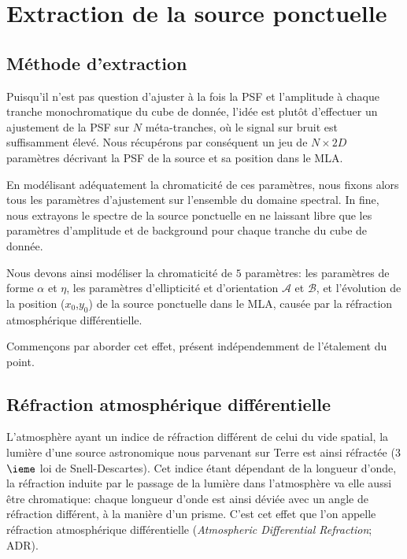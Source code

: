 \documentclass[../main/main.tex]{subfiles}
\begin{document}
\section{Extraction de la source ponctuelle}

\subsection{Méthode d'extraction}\label{ssec:methodextraction}

Puisqu'il n'est pas question d'ajuster à la fois la PSF et l'amplitude à
chaque tranche monochromatique du cube de donnée, l'idée est plutôt d'effectuer un
ajustement de la PSF sur $N$ méta-tranches, où le signal sur bruit est
suffisamment élevé. Nous récupérons par conséquent
un jeu de $N\times2D$ paramètres décrivant la PSF de la source et sa position 
dans le MLA.

En modélisant adéquatement la chromaticité de ces paramètres, nous
fixons alors tous les paramètres d'ajustement sur l'ensemble du domaine
spectral. In fine, nous extrayons le spectre de la source
ponctuelle en ne laissant libre que les paramètres d'amplitude et de
background pour chaque tranche du cube de donnée.

Nous devons ainsi modéliser la chromaticité de $5$ paramètres: les
paramètres de forme $\alpha$ et $\eta$, les paramètres d'ellipticité et
d'orientation $\mathcal{A}$ et $\mathcal{B}$, et l'évolution de la
position ($x_{0}$,$y_{0}$) de la source ponctuelle dans le MLA, causée
par la réfraction atmosphérique différentielle.

Commençons par aborder cet effet, présent indépendemment de l'étalement
du point.


\subsection{R\'efraction atmosph\'erique
  diff\'erentielle}\label{ssec:adr}


L'atmosphère ayant un indice de réfraction différent de celui du vide
spatial, la lumière d'une source astronomique nous parvenant sur Terre
est ainsi réfractée (3$\ieme$ loi de Snell-Descartes). Cet indice étant dépendant de la longueur d'onde, la
réfraction induite par le passage de la lumière dans l'atmosphère va
elle aussi être chromatique: chaque longueur d'onde est ainsi déviée
avec un angle de réfraction différent, à la manière d'un prisme. C'est
cet effet que l'on appelle réfraction atmosphérique différentielle
(\textit{Atmospheric Differential Refraction}; ADR).
\end{document}

